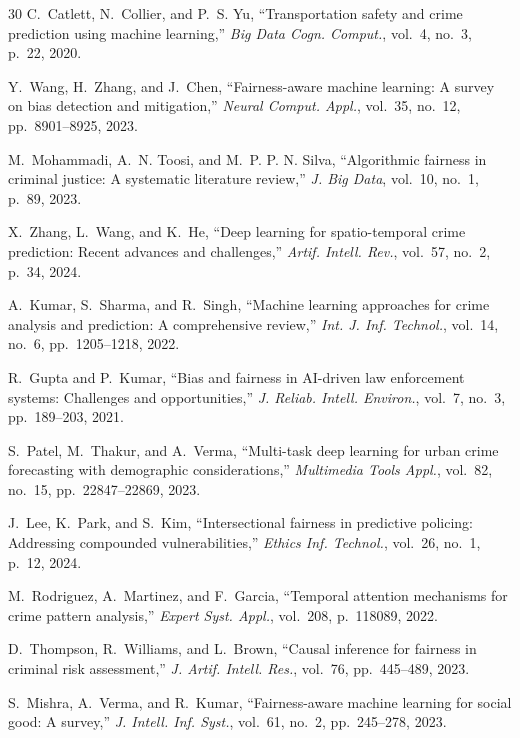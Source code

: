 \documentclass[conference]{IEEEtran}
\begin{document}
\begin{thebibliography}{30}
C.~Catlett, N.~Collier, and P.~S. Yu, ``Transportation safety and crime prediction using machine learning,'' \textit{Big Data Cogn. Comput.}, vol.~4, no.~3, p.~22, 2020.

Y.~Wang, H.~Zhang, and J.~Chen, ``Fairness-aware machine learning: A survey on bias detection and mitigation,'' \textit{Neural Comput. Appl.}, vol.~35, no.~12, pp.~8901--8925, 2023.

M.~Mohammadi, A.~N. Toosi, and M.~P. P. N. Silva, ``Algorithmic fairness in criminal justice: A systematic literature review,'' \textit{J. Big Data}, vol.~10, no.~1, p.~89, 2023.

X.~Zhang, L.~Wang, and K.~He, ``Deep learning for spatio-temporal crime prediction: Recent advances and challenges,'' \textit{Artif. Intell. Rev.}, vol.~57, no.~2, p.~34, 2024.

A.~Kumar, S.~Sharma, and R.~Singh, ``Machine learning approaches for crime analysis and prediction: A comprehensive review,'' \textit{Int. J. Inf. Technol.}, vol.~14, no.~6, pp.~1205--1218, 2022.

R.~Gupta and P.~Kumar, ``Bias and fairness in AI-driven law enforcement systems: Challenges and opportunities,'' \textit{J. Reliab. Intell. Environ.}, vol.~7, no.~3, pp.~189--203, 2021.

S.~Patel, M.~Thakur, and A.~Verma, ``Multi-task deep learning for urban crime forecasting with demographic considerations,'' \textit{Multimedia Tools Appl.}, vol.~82, no.~15, pp.~22847--22869, 2023.

J.~Lee, K.~Park, and S.~Kim, ``Intersectional fairness in predictive policing: Addressing compounded vulnerabilities,'' \textit{Ethics Inf. Technol.}, vol.~26, no.~1, p.~12, 2024.

M.~Rodriguez, A.~Martinez, and F.~Garcia, ``Temporal attention mechanisms for crime pattern analysis,'' \textit{Expert Syst. Appl.}, vol.~208, p.~118089, 2022.

D.~Thompson, R.~Williams, and L.~Brown, ``Causal inference for fairness in criminal risk assessment,'' \textit{J. Artif. Intell. Res.}, vol.~76, pp.~445--489, 2023.

S.~Mishra, A.~Verma, and R.~Kumar, ``Fairness-aware machine learning for social good: A survey,'' \textit{J. Intell. Inf. Syst.}, vol.~61, no.~2, pp.~245--278, 2023.


\end{thebibliography}
\end{document}
